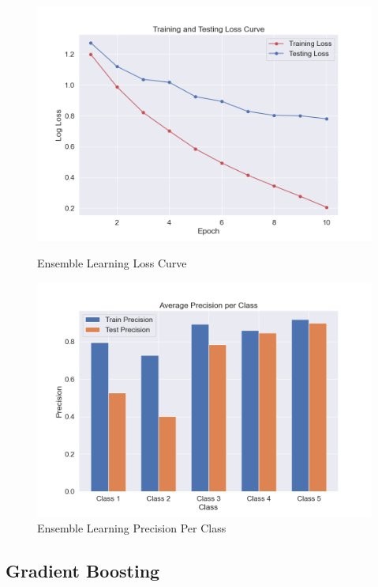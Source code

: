 \begin{figure}[H]
	\vspace{1em}
	
	\begin{minipage}[b]{0.45\textwidth}
		\centering
		\includegraphics[width=\textwidth]{img/paper_1//loss_curve.png}
		\caption{Ensemble Learning Loss Curve}
	\end{minipage}
	\hfill
	\begin{minipage}[b]{0.45\textwidth}
		\centering
		\includegraphics[width=\textwidth]{img/paper_1//precision_per_class.png}
		\caption{Ensemble Learning Precision Per Class}
	\end{minipage}
\end{figure}


\subsection{Gradient Boosting}

